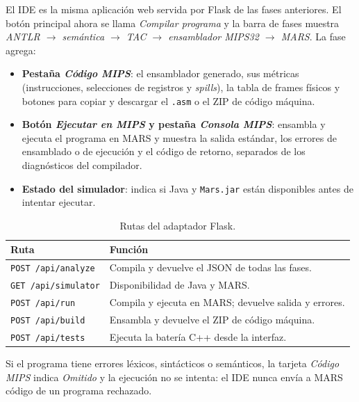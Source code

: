\documentclass[11pt,a4paper]{article}
\begin{document}
El IDE es la misma aplicación web servida por Flask de las fases anteriores. El
botón principal ahora se llama \emph{Compilar programa} y la barra de fases
muestra \emph{ANTLR $\rightarrow$ semántica $\rightarrow$ TAC $\rightarrow$
ensamblador MIPS32 $\rightarrow$ MARS}. La fase agrega:

\begin{itemize}[leftmargin=1.4em]
  \item \textbf{Pestaña \emph{Código MIPS}}: el ensamblador generado, sus
        métricas (instrucciones, selecciones de registros y \emph{spills}), la
        tabla de frames físicos y botones para copiar y descargar el
        \texttt{.asm} o el ZIP de código máquina.
  \item \textbf{Botón \emph{Ejecutar en MIPS} y pestaña \emph{Consola MIPS}}:
        ensambla y ejecuta el programa en MARS y muestra la salida estándar, los
        errores de ensamblado o de ejecución y el código de retorno, separados
        de los diagnósticos del compilador.
  \item \textbf{Estado del simulador}: indica si Java y \texttt{Mars.jar} están
        disponibles antes de intentar ejecutar.
\end{itemize}

\begin{table}[H]
\centering
\small
\begin{tabular}{@{}L{3.6cm}L{10.6cm}@{}}
\toprule
\textbf{Ruta} & \textbf{Función} \\
\midrule
\texttt{POST /api/analyze} & Compila y devuelve el JSON de todas las fases. \\
\texttt{GET /api/simulator} & Disponibilidad de Java y MARS. \\
\texttt{POST /api/run} & Compila y ejecuta en MARS; devuelve salida y errores. \\
\texttt{POST /api/build} & Ensambla y devuelve el ZIP de código máquina. \\
\texttt{POST /api/tests} & Ejecuta la batería C++ desde la interfaz. \\
\bottomrule
\end{tabular}
\caption{Rutas del adaptador Flask.}
\end{table}

Si el programa tiene errores léxicos, sintácticos o semánticos, la tarjeta
\emph{Código MIPS} indica \emph{Omitido} y la ejecución no se intenta: el IDE
nunca envía a MARS código de un programa rechazado.

\end{document}
